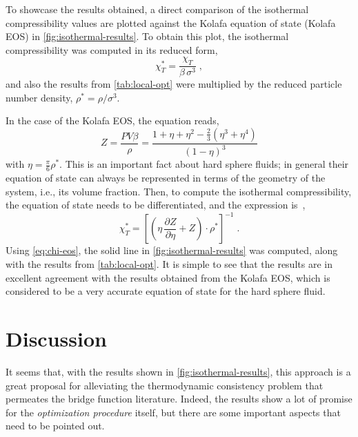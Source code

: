 To showcase the results obtained, a direct comparison of the isothermal compressibility 
values are plotted against the Kolafa equation of state (Kolafa EOS) in 
\autoref{fig:isothermal-results}. To obtain this plot, the isothermal compressibility was 
computed in its reduced form,
\begin{equation}
    \chi_{T}^{*} =  \frac{\chi_{T}}{\beta \, \sigma^3}
    \; ,
    \label{eq:reduced-chi}
\end{equation}
and also the results from \autoref{tab:local-opt} were multiplied by the reduced particle 
number density, \(\rho^{*} = \rho / \sigma^3 .\)

In the case of the Kolafa EOS, the equation reads,
\begin{equation}
    Z = \frac{P V \beta}{\rho} = \frac{1 + \eta + \eta^2 - \frac{2}{3} (\eta^3 + \eta^4)}{{\left(1 - \eta\right)}^{3}}
    \label{eq:kolafa}
\end{equation}
with \(\eta = \frac{\pi}{6} \rho^{*} .\) This is an important fact about hard sphere 
fluids; in general their equation of state can always be represented in terms of the 
geometry of the system, i.e., its volume fraction.
Then, to compute the isothermal compressibility, the equation of state needs to be 
differentiated, and the expression is~\cite{liuCarnahanStarlingTypeEquations2021},
\begin{equation}
    \chi_{T}^{*} = {\left[\left(\eta \, \frac{\partial Z}{\partial \eta} + Z\right) \cdot \rho^{*}\right]}^{-1}
    \; .
    \label{eq:chi-eos}
\end{equation}
Using \autoref{eq:chi-eos}, the solid line in \autoref{fig:isothermal-results} was 
computed, along with the results from \autoref{tab:local-opt}. It is simple to see that the 
results are in excellent agreement with the results obtained from the Kolafa EOS, which is 
considered to be a very accurate equation of state for the hard sphere fluid.

\section{Discussion}
It seems that, with the results shown in \autoref{fig:isothermal-results}, this approach is 
a great proposal for alleviating the thermodynamic consistency problem that permeates the 
bridge function literature. Indeed, the results show a lot of promise for the
\emph{optimization procedure} itself, but there are some important aspects that need to be 
pointed out.

